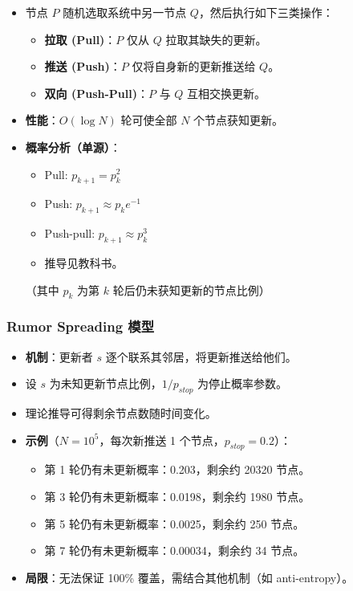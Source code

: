 \begin{itemize}
\item 节点 $P$ 随机选取系统中另一节点 $Q$，然后执行如下三类操作：
  \begin{itemize}
  \item \textbf{拉取 (Pull)}：$P$ 仅从 $Q$ 拉取其缺失的更新。
  \item \textbf{推送 (Push)}：$P$ 仅将自身新的更新推送给 $Q$。
  \item \textbf{双向 (Push-Pull)}：$P$ 与 $Q$ 互相交换更新。
  \end{itemize}
\item \textbf{性能}：$O(\log N)$ 轮可使全部 $N$ 个节点获知更新。
\item \textbf{概率分析（单源）}：
  \begin{itemize}
  \item Pull: $p_{k+1} = p_k^2$
  \item Push: $p_{k+1} \approx p_k e^{-1}$
  \item Push-pull: $p_{k+1} \approx p_k^3$
  \item 推导见教科书。
  \end{itemize}
  （其中 $p_k$ 为第 $k$ 轮后仍未获知更新的节点比例）
\end{itemize}

\subsubsection{Rumor Spreading 模型}

\begin{itemize}
\item \textbf{机制}：更新者 $s$ 逐个联系其邻居，将更新推送给他们。
\item 设 $s$ 为未知更新节点比例，$1/p_{stop}$ 为停止概率参数。
\item 理论推导可得剩余节点数随时间变化。
\item \textbf{示例}（$N = 10^5$，每次新推送 1 个节点，$p_{stop}=0.2$）：
  \begin{itemize}
  \item 第 1 轮仍有未更新概率：0.203，剩余约 20320 节点。
  \item 第 3 轮仍有未更新概率：0.0198，剩余约 1980 节点。
  \item 第 5 轮仍有未更新概率：0.0025，剩余约 250 节点。
  \item 第 7 轮仍有未更新概率：0.00034，剩余约 34 节点。
  \end{itemize}
\item \textbf{局限}：无法保证 100\% 覆盖，需结合其他机制（如 anti-entropy）。
\end{itemize}


